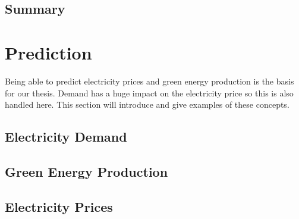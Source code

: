\documentclass[twoside,11pt,openright]{report}
\begin{document}

\subsection{Summary}

\newpage
\section{Prediction}
Being able to predict electricity prices and green energy production is the basis for our thesis. Demand has a huge impact on the electricity price so this is also handled here. This section will introduce and give examples of these concepts. 

\subsection{Electricity Demand}


\subsection{Green Energy Production}


\subsection{Electricity Prices}
 
% 
%
\\[0.5cm]


\end{document}
